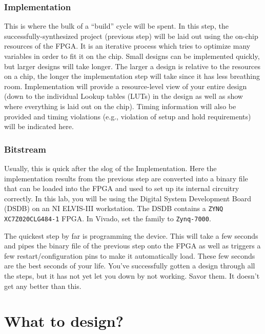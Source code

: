 \documentclass{article}
\begin{document}
\subsubsection{Implementation}

This is where the bulk of a “build” cycle will be spent. In this
step, the successfully-synthesized project (previous step) will be
laid out using the on-chip resources of the FPGA. It is an iterative
process which tries to optimize many variables in order to fit it on
the chip. Small designs can be implemented quickly, but larger designs
will take longer. The larger a design is relative to the resources on
a chip, the longer the implementation step will take since it has
less breathing room. Implementation will provide a resource-level
view of your entire design (down to the individual Lookup tables
(LUTs) in the design as well as show where everything is laid out on
the chip). Timing information will also be provided and timing
violations (e.g., violation of setup and hold requirements) will be
indicated here.

\subsubsection{Bitstream}

Usually, this is quick after the slog of the Implementation. Here the
implementation results from the previous step are converted into a
binary file that can be loaded into the FPGA and used to set up its
internal circuitry correctly.
In this lab, you will be using the
Digital System Development Board (DSDB) on an NI ELVIS-III
workstation. The DSDB contains a \verb!ZYNQ XC7Z020CLG484-1! FPGA.  In
Vivado, set the family to \verb!Zynq-7000!.

The quickest step by far is programming the device. This will take a
few seconds and pipes the
binary file of the previous step onto the FPGA as well as triggers a
few restart/configuration pins to make it automatically load. These
few seconds are the best seconds of your life. You've successfully
gotten a design through all the steps, but it has not yet let you down
by not working. Savor them. It doesn't get any better than this.

\section{What to design?}
\end{document}
